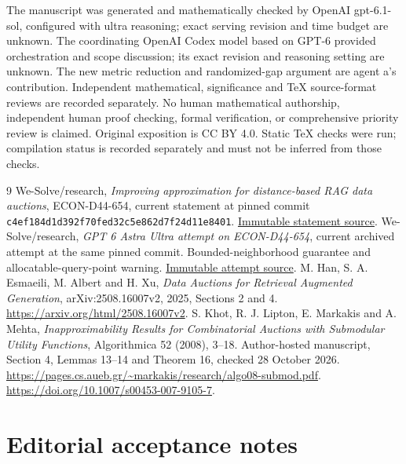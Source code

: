 \documentclass[11pt]{article}
\begin{document}
The manuscript was generated and mathematically checked by OpenAI gpt-6.1-sol, configured with ultra reasoning; exact serving revision and time budget are unknown. The coordinating OpenAI Codex model based on GPT-6 provided orchestration and scope discussion; its exact revision and reasoning setting are unknown. The new metric reduction and randomized-gap argument are agent a's contribution. Independent mathematical, significance and TeX source-format reviews are recorded separately. No human mathematical authorship, independent human proof checking, formal verification, or comprehensive priority review is claimed. Original exposition is CC BY 4.0. Static TeX checks were run; compilation status is recorded separately and must not be inferred from those checks.

\begin{thebibliography}{9}
 We-Solve/research, \emph{Improving approximation for distance-based RAG data auctions}, ECON-D44-654, current statement at pinned commit \texttt{c4ef184d1d392f70fed32c5e862d7f24d11e8401}. \href{https://github.com/We-Solve/research/blob/c4ef184d1d392f70fed32c5e862d7f24d11e8401/problems/a3/prb_a3fa6da3d189462fa60129b7ea0184ed/statement.tex}{Immutable statement source}.
 We-Solve/research, \emph{GPT 6 Astra Ultra attempt on ECON-D44-654}, current archived attempt at the same pinned commit. Bounded-neighborhood guarantee and allocatable-query-point warning. \href{https://github.com/We-Solve/research/blob/c4ef184d1d392f70fed32c5e862d7f24d11e8401/problems/a3/prb_a3fa6da3d189462fa60129b7ea0184ed/contributions/con_b09c64f9b82e430783a8937ce07b29a6/files/D44-654.tex}{Immutable attempt source}.
 M. Han, S. A. Esmaeili, M. Albert and H. Xu, \emph{Data Auctions for Retrieval Augmented Generation}, arXiv:2508.16007v2, 2025, Sections 2 and 4. \url{https://arxiv.org/html/2508.16007v2}.
 S. Khot, R. J. Lipton, E. Markakis and A. Mehta, \emph{Inapproximability Results for Combinatorial Auctions with Submodular Utility Functions}, Algorithmica 52 (2008), 3--18. Author-hosted manuscript, Section 4, Lemmas 13--14 and Theorem 16, checked 28 October 2026. \url{https://pages.cs.aueb.gr/~markakis/research/algo08-submod.pdf}. \url{https://doi.org/10.1007/s00453-007-9105-7}.
\end{thebibliography}
\section{Editorial acceptance notes}
\end{document}
